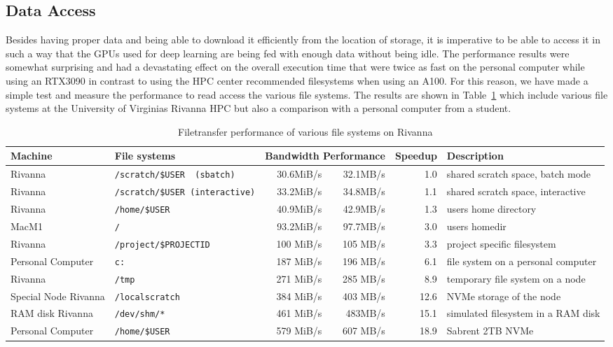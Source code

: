\documentclass[utf8]{FrontiersinVancouver} %
\begin{document}
\subsection{Data Access}

Besides having proper data and being able to download it efficiently
from the location of storage, it is imperative to be able to access it
in such a way that the GPUs used for deep learning are being fed with
enough data without being idle. The performance results were somewhat
surprising and had a devastating effect on the overall execution time
that were twice as fast on the personal computer while using an
RTX3090 in contrast to using the HPC center recommended filesystems
when using an A100. For this reason, we have made a simple test and
measure the performance to read access the various file systems. The
results are shown in Table~\ref{tab:file-performance} which include
various file systems at the University of Virginias Rivanna HPC but also a
comparison with a personal computer from a student.

\begin{table}[htb]
  \caption{Filetransfer performance of various file systems on Rivanna}
  \label{tab:file-performance}
  \begin{center}
  {\footnotesize 
  \begin{tabular}{llrrrp{4.5cm}}
    Machine & File systems & \multicolumn{2}{l}{Bandwidth Performance} & Speedup & Description \\
    \hline
    Rivanna & \verb|/scratch/$USER  (sbatch)|     & 30.6MiB/s & 32.1MB/s  & 1.0 & shared scratch space, batch mode \\
    Rivanna & \verb|/scratch/$USER (interactive)| & 33.2MiB/s &  34.8MB/s  & 1.1 & shared scratch space, interactive \\
    Rivanna & \verb|/home/$USER|                    & 40.9MiB/s & 42.9MB/s  & 1.3 & users home directory \\
    MacM1   & \verb|/| & 93.2MiB/s & 97.7MB/s & 3.0 & users homedir \\
    Rivanna & \verb|/project/$PROJECTID |     & 100 MiB/s  & 105 MB/s  & 3.3 & project specific filesystem \\
    Personal Computer  & \verb|c:| & 187 MiB/s  & 196 MB/s  & 6.1 &  file system on a personal computer \\
    Rivanna & \verb|/tmp|                         & 271 MiB/s  & 285 MB/s  & 8.9 & temporary file system on a node \\
    \hline
    Special Node Rivanna & \verb|/localscratch|  &  384 MiB/s & 403 MB/s  & 12.6 & NVMe storage of the node\\
    RAM disk Rivanna  & \verb|/dev/shm/*|      &             461 MiB/s & 483MB/s  & 15.1 & simulated filesystem in a RAM disk\\
    Personal Computer & \verb|/home/$USER| & 579 MiB/s & 607 MB/s &  18.9 & Sabrent 2TB NVMe\\
    \hline                                             
    \end{tabular}
  }
    \end{center}
  \end{table}
  
\end{document}
